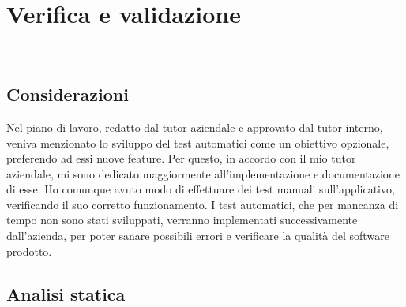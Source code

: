 
\chapter{Verifica e validazione}
\label{cap:verifica-validazione}

\\

\section{Considerazioni}
\label{sec:considerazioni}

Nel piano di lavoro, redatto dal tutor aziendale e approvato dal tutor interno, veniva menzionato lo sviluppo del test automatici come un obiettivo opzionale, preferendo ad essi nuove feature. Per questo, in accordo con il mio tutor aziendale, mi sono dedicato maggiormente all’implementazione e documentazione di esse. Ho comunque avuto modo di effettuare dei test manuali sull’applicativo, verificando il suo corretto funzionamento. I test automatici, che per mancanza di tempo non sono stati sviluppati, verranno implementati successivamente dall’azienda, per poter sanare possibili errori e verificare la qualità del software prodotto.

\section{Analisi statica}

